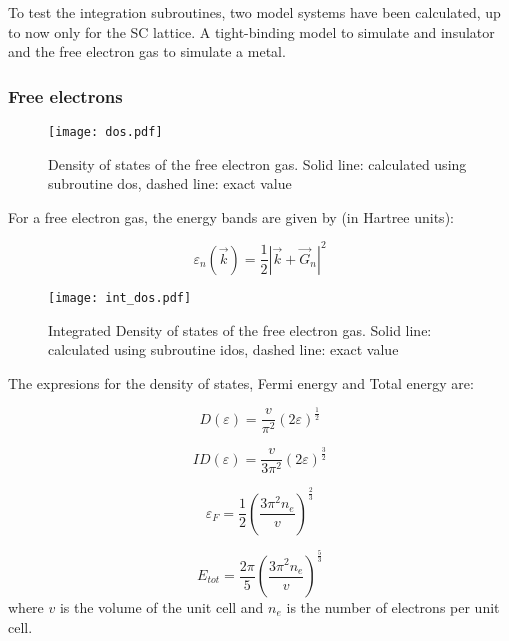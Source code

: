 To test the integration subroutines, two model systems have been
calculated, up to now only for the SC lattice. A tight-binding model to
simulate and insulator and the free electron gas to simulate a metal.

\subsubsection{Free electrons}

\begin{center}
\begin{figure}[h]
\texttt{[image: dos.pdf]}
\caption{Density of states of the free electron gas. Solid line:
calculated using subroutine dos, dashed line: exact value} \label{dos}
\end{figure}
\end{center}
For a free electron gas, the energy bands are given by (in Hartree units):

\begin{equation}
\varepsilon_n(\vec{k})=\frac{1}{2}|\vec{k}+\vec{G}_n|^2
\end{equation}

\begin{figure}[h]
\texttt{[image: int\_dos.pdf]}
\caption{Integrated Density of states of the free electron gas. Solid line:
calculated using subroutine idos, dashed line: exact value} \label{idos}
\end{figure}

The expresions for the density of states, Fermi energy and Total energy
are:

\begin{equation}
D(\varepsilon)=\frac{v}{\pi^2}(2\varepsilon)^{\frac{1}{2}}
\end{equation}

\begin{equation}
ID(\varepsilon)=\frac{v}{3\pi^2}(2\varepsilon)^{\frac{3}{2}}
\end{equation}

\begin{equation}
\varepsilon_F =  \frac{1}{2}\left(\frac{3\pi^2
n_e}{v}\right)^{\frac{2}{3}}
\end{equation}

\begin{equation}
E_{tot}= \frac{2\pi}{5}\left(\frac{3\pi^2 n_e}{v}\right)^{\frac{5}{3}}
\end{equation}
where $v$ is the volume of the unit cell and $n_e$ is the number of
electrons per unit cell.

